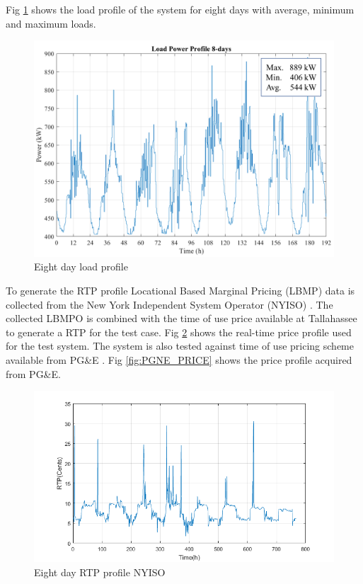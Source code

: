 Fig \ref{fig:LOAD_PROFILE_8} shows the load profile of the system for eight days with average, minimum and maximum loads.

\begin{figure}[!ht]
    \centering
    \includegraphics[width = \linewidth]{figs/loadprofile.png}
    \caption{Eight day load profile}
    \label{fig:LOAD_PROFILE_8}
\end{figure}

To generate the RTP profile Locational Based Marginal Pricing (LBMP) data is collected from the New York Independent System Operator (NYISO) \cite{NYISO2017}. The collected LBMPO is combined with the time of use price available at Tallahassee to generate a RTP for the test case. Fig \ref{fig:RTP_PROFILE_8} shows the real-time price profile used for the test system. The system is also tested against time of use pricing scheme available from PG\&E \cite{pgne}. Fig \ref{fig:PGNE_PRICE} shows the price profile acquired from PG\&E.

\begin{figure}[!ht]
    \centering
    \includegraphics[width = \linewidth]{figs/rtp_8days.png}
    \caption{Eight day RTP profile NYISO}
    \label{fig:RTP_PROFILE_8}
\end{figure}

